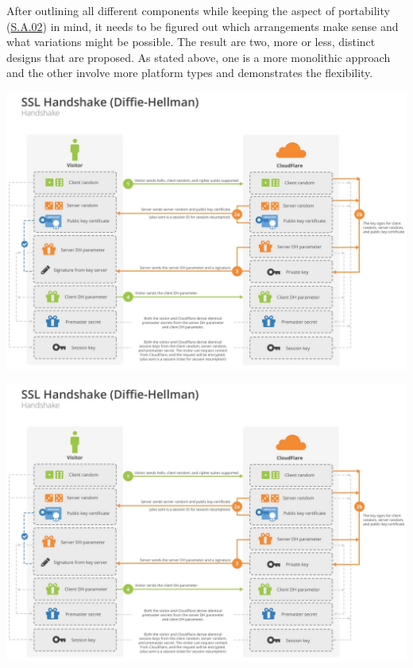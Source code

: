 \documentclass[12pt,english,a4paper,titlepage,cleardoublepage=empty,dottedtoc]{report}
\let\origfigure=\figure
\let\endorigfigure=\endfigure
\renewenvironment{figure}[1][]{%
\origfigure[b]
}{%
\endorigfigure
}
\begin{document}
After outlining all different components while keeping the aspect of
portability (\protect\hyperlink{sa02}{S.A.02}) in mind, it needs to be
figured out which arrangements make sense and what variations might be
possible. The result are two, more or less, distinct designs that are
proposed. As stated above, one is a more monolithic approach and the
other involve more platform types and demonstrates the flexibility.

\begin{figure}
\centering
\includegraphics{./assets/figures/TODO_pdaas_component-composition_monolithic.jpg}
\caption{PDaaS Architecture, monolithic
composition\label{fig:composition-monolithic}}
\end{figure}

\begin{figure}
\centering
\includegraphics{./assets/figures/TODO_pdaas_component-composition_distributed.jpg}
\caption{PDaaS Architecture, distributed
composition\label{fig:composition-distributed}}
\end{figure}
\end{document}
